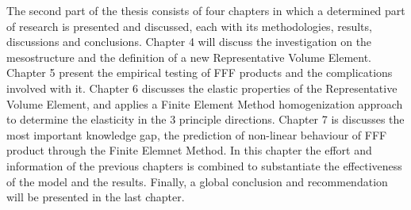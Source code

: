 The second part of the thesis consists of four chapters in which a determined part of research is presented and discussed, each with its methodologies, results, discussions and conclusions. Chapter 4 will discuss the investigation on the mesostructure and the definition of a new Representative Volume Element. Chapter 5 present the empirical testing of FFF products and the complications involved with it. Chapter 6 discusses the elastic properties of the Representative Volume Element, and applies a Finite Element Method homogenization approach to determine the elasticity in the 3 principle directions. Chapter 7 is discusses the most important knowledge gap, the prediction of non-linear behaviour of FFF product through the Finite Elemnet Method. In this chapter the effort and information of the previous chapters is combined to substantiate the effectiveness of the model and  the results. 
Finally, a global conclusion and recommendation will be presented in the last chapter. 












